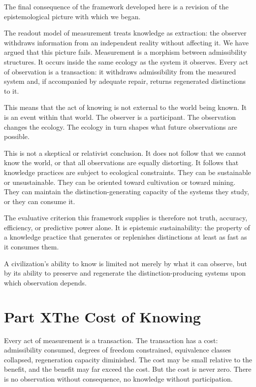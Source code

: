 \documentclass[12pt, a4paper]{article}
\theoremstyle{flyxion}
\begin{document}
The final consequence of the framework developed here is a revision of the epistemological picture with which we began.

The readout model of measurement treats knowledge as extraction: the observer withdraws information from an independent reality without affecting it. We have argued that this picture fails. Measurement is a morphism between admissibility structures. It occurs inside the same ecology as the system it observes. Every act of observation is a transaction: it withdraws admissibility from the measured system and, if accompanied by adequate repair, returns regenerated distinctions to it.

This means that the act of knowing is not external to the world being known. It is an event within that world. The observer is a participant. The observation changes the ecology. The ecology in turn shapes what future observations are possible.

This is not a skeptical or relativist conclusion. It does not follow that we cannot know the world, or that all observations are equally distorting. It follows that knowledge practices are subject to ecological constraints. They can be sustainable or unsustainable. They can be oriented toward cultivation or toward mining. They can maintain the distinction-generating capacity of the systems they study, or they can consume it.

The evaluative criterion this framework supplies is therefore not truth, accuracy, efficiency, or predictive power alone. It is epistemic sustainability: the property of a knowledge practice that generates or replenishes distinctions at least as fast as it consumes them.

A civilization's ability to know is limited not merely by what it can observe, but by its ability to preserve and regenerate the distinction-producing systems upon which observation depends.


\section*{Part X\quad The Cost of Knowing}

Every act of measurement is a transaction. The transaction has a cost: admissibility consumed, degrees of freedom constrained, equivalence classes collapsed, regeneration capacity diminished. The cost may be small relative to the benefit, and the benefit may far exceed the cost. But the cost is never zero. There is no observation without consequence, no knowledge without participation.
\end{document}
